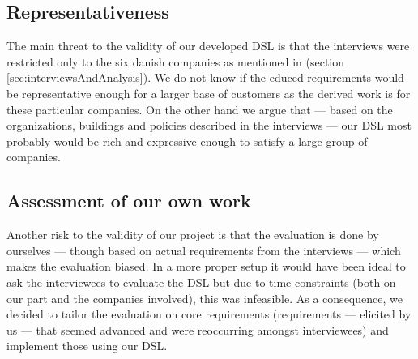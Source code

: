 \subsection{Representativeness}
The main threat to the validity of our developed DSL is that the interviews were restricted only to the six danish companies as mentioned in  (section \ref{sec:interviewsAndAnalysis}). We do not know if the educed requirements would be representative enough for a larger base of customers as the derived work is for these particular companies. On the other hand we argue that --- based on the organizations, buildings and policies described in the interviews --- our DSL most probably would be rich and expressive enough to satisfy a large group of companies.

\subsection{Assessment of our own work}
Another risk to the validity of our project is that the evaluation is done by ourselves --- though based on actual requirements from the interviews --- which makes the evaluation biased. In a more proper setup it would have been ideal to ask the interviewees to evaluate the DSL but due to time constraints (both on our part and the companies involved), this was infeasible. As a consequence, we decided to tailor the evaluation on core requirements (requirements --- elicited by us --- that seemed advanced and were reoccurring amongst interviewees) and implement those using our DSL.